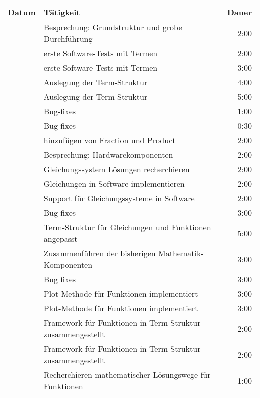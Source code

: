 \begin{longtabu} to \textwidth{l | X | r}
	\textbf{Datum} & \textbf{Tätigkeit} & \textbf{Dauer}\\\hline
	
	 & Besprechung: Grundstruktur und grobe Durchführung & 2:00\\\hline
	
	 & erste Software-Tests mit Termen & 2:00\\\hline
	 & erste Software-Tests mit Termen & 3:00\\\hline
	 & Auslegung der Term-Struktur & 4:00\\\hline
	 & Auslegung der Term-Struktur & 5:00\\\hline
	 & Bug-fixes & 1:00\\\hline
	 & Bug-fixes & 0:30\\\hline
	 & hinzufügen von Fraction und Product & 2:00\\\hline
	 & Besprechung: Hardwarekomponenten & 2:00\\\hline
	
	 & Gleichungssystem Lösungen recherchieren & 2:00\\\hline
	 & Gleichungen in Software implementieren & 2:00\\\hline
	 & Support für Gleichungssysteme in Software & 2:00\\\hline
	 & Bug fixes & 3:00\\\hline
	 & Term-Struktur für Gleichungen und Funktionen angepasst & 5:00\\\hline
	 & Zusammenführen der bisherigen Mathematik-Komponenten & 3:00\\\hline
	 & Bug fixes & 3:00\\\hline
	 & Plot-Methode für Funktionen implementiert & 3:00\\\hline
	 & Plot-Methode für Funktionen implementiert & 3:00\\\hline
	 & Framework für Funktionen in Term-Struktur zusammengestellt & 2:00\\\hline
	 & Framework für Funktionen in Term-Struktur zusammengestellt & 2:00\\\hline
	 & Recherchieren mathematischer Lösungswege für Funktionen  & 1:00\\\hline
	

\end{longtabu}
